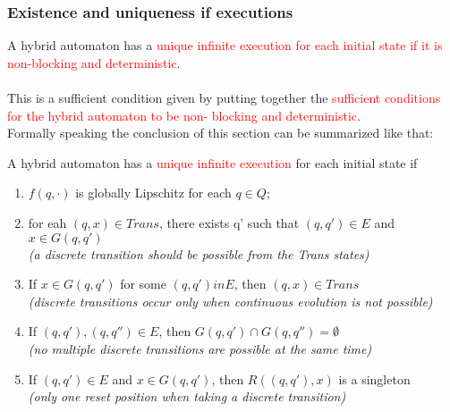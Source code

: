 \subsubsection{Existence and uniqueness if executions}
A hybrid automaton has a \textcolor{red}{unique infinite execution for each initial state if it is non-blocking and deterministic}.\\
\\
This is a sufficient condition given by  putting together the \textcolor{red}{sufficient conditions for the hybrid automaton to be non- blocking and deterministic}.\\
Formally speaking the conclusion of this section can be summarized like that:
\begin{tcolorbox}
	A hybrid automaton has a \textcolor{red}{unique infinite execution} for each initial state if
	\begin{enumerate}
		\item $f(q,\cdot)$ is globally Lipschitz for each $q\in Q$;
		\item for eah $(q,x)\in Trans$, there exists q' such that $(q,q')\in E$ and $x \in G(q,q')$ \\ \emph{(a discrete transition should be possible from the Trans states)
		}
		\item If $x \in G(q,q')$ for some $(q,q') in E$, then $(q,x) \in Trans$\\ \emph{(discrete transitions occur only when continuous evolution is not possible)}
		\item If $(q,q'),(q,q'')\in E$, then $G(q,q')\cap G(q,q'')=\emptyset$ \\ \emph{(no multiple discrete transitions are possible at the same time)}
		\item If $(q,q')\in E$ and $x\in G(q,q')$, then $R((q,q'),x)$ is a singleton\\ \emph{(only one reset position when taking a discrete transition)}
	\end{enumerate}
\end{tcolorbox}

